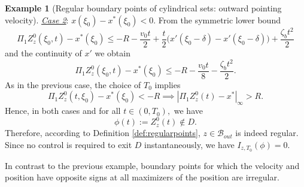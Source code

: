 \documentclass[10pt, reqno]{amsart}
\theoremstyle{definition}
\newtheorem{example}{Example}
\numberwithin{lem}{section}
\numberwithin{cor}{section}
\numberwithin{prop}{section}
\numberwithin{thm}{section}
\numberwithin{dfn}{section}
\begin{document}
\begin{example}[Regular boundary points of cylindrical sets: outward pointing velocity]
\noindent\underline{\textit{Case 2}}:  $x(\xi_0)-x^*(\xi_0)<0.$ From the symmetric lower bound 
\begin{equation*}
     \Pi_1Z^0_z(\xi_0,t)-x^*(\xi_0)\leq -R-\frac{v_0t}{2}+\frac{t}{2}\bigg(x'(\xi_0-\delta)-x'(\xi_0-\delta)\bigg)+ \frac{\zeta_bt^2}{2}
\end{equation*}
and the continuity of $x'$ we obtain 
\begin{equation*}
     \Pi_1Z^0_z(\xi_0,t)-x^*(\xi_0)\leq -R-\frac{v_0t}{8}- \frac{\zeta_bt^2}{2}.
\end{equation*}
As in the previous case, the choice of $T_0$ implies
$$\Pi_1Z^0_z(t, \xi_0)-x^*(\xi_0)<-R\implies |\Pi_1Z^0_z(t)-x^*|_{\infty}>R. $$
Hence, in  both cases and for all $t\in (0,T_0),$ we have
$$\phi(t):=Z^0_z(t)\notin D.$$ Therefore, according to Definition \ref{def:regularpoints}, $z\in \mathcal{B}_{out}$ is indeed regular. Since no control is required to exit $D$ instantaneously, we have $I_{z,T_0}(\phi)=0.$
\end{example}



In contrast to the previous example, boundary points for which the velocity and position have opposite signs at all maximizers of the position are irregular.\\
\end{document}
